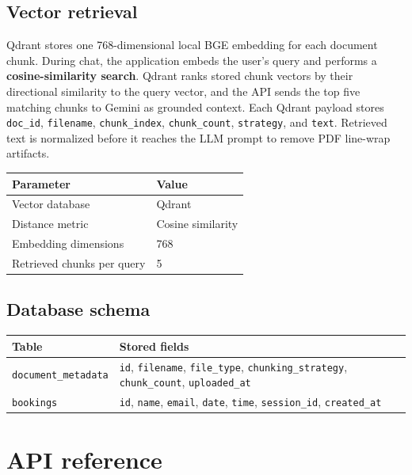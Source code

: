 \documentclass[12pt, a4paper]{article}
\begin{document}
\subsection{Vector retrieval}

Qdrant stores one 768-dimensional local BGE embedding for each document chunk.
During chat, the application embeds the user's query and performs a
\textbf{cosine-similarity search}. Qdrant ranks stored chunk vectors by their
directional similarity to the query vector, and the API sends the top five
matching chunks to Gemini as grounded context. Each Qdrant payload stores
\texttt{doc\_id}, \texttt{filename}, \texttt{chunk\_index},
\texttt{chunk\_count}, \texttt{strategy}, and \texttt{text}. Retrieved text is
normalized before it reaches the LLM prompt to remove PDF line-wrap artifacts.

\begin{center}
\begin{tabular}{L{5cm} L{8cm}}
    \toprule
    \textbf{Parameter} & \textbf{Value} \\
    \midrule
    Vector database & Qdrant \\
    Distance metric & Cosine similarity \\
    Embedding dimensions & 768 \\
    Retrieved chunks per query & 5 \\
    \bottomrule
\end{tabular}
\end{center}

\subsection{Database schema}

\begin{tabularx}{\textwidth}{L{3.5cm} Y}
    \toprule
    \textbf{Table} & \textbf{Stored fields} \\
    \midrule
    \texttt{document\_metadata} &
    \texttt{id}, \texttt{filename}, \texttt{file\_type},
    \texttt{chunking\_strategy}, \texttt{chunk\_count},
    \texttt{uploaded\_at} \\
    \texttt{bookings} &
    \texttt{id}, \texttt{name}, \texttt{email}, \texttt{date},
    \texttt{time}, \texttt{session\_id}, \texttt{created\_at} \\
    \bottomrule
\end{tabularx}

\section{API reference}
\end{document}
